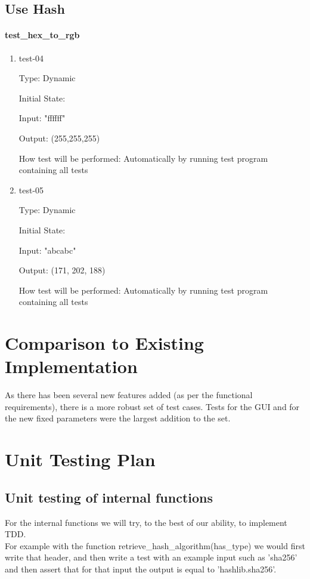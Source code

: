 \documentclass[12pt, titlepage]{article}
\begin{document}
\subsection{Use Hash}


\paragraph{test\_hex\_to\_rgb}

\begin{enumerate}

\item{test-04\\}

Type: Dynamic

Initial State:

Input: "ffffff"

Output: (255,255,255)

How test will be performed: Automatically by running test program containing all tests

\item{test-05\\}

Type: Dynamic

Initial State:

Input: "abcabc"

Output: (171, 202, 188)

How test will be performed: Automatically by running test program containing all tests

\end{enumerate}


\section{Comparison to Existing Implementation}

As there has been several new features added (as per the functional requirements), there is a more robust set of test cases. Tests for the GUI and for the new fixed parameters were the largest addition to the set.

\section{Unit Testing Plan}

\subsection{Unit testing of internal functions}
For the internal functions we will try, to the best of our ability, to implement TDD.
\\
For example with the function retrieve\_hash\_algorithm(has\_type) we would first write that header, and then write a test with an example input such as 'sha256' and then assert that for that input the output is equal to 'hashlib.sha256'.
\end{document}
